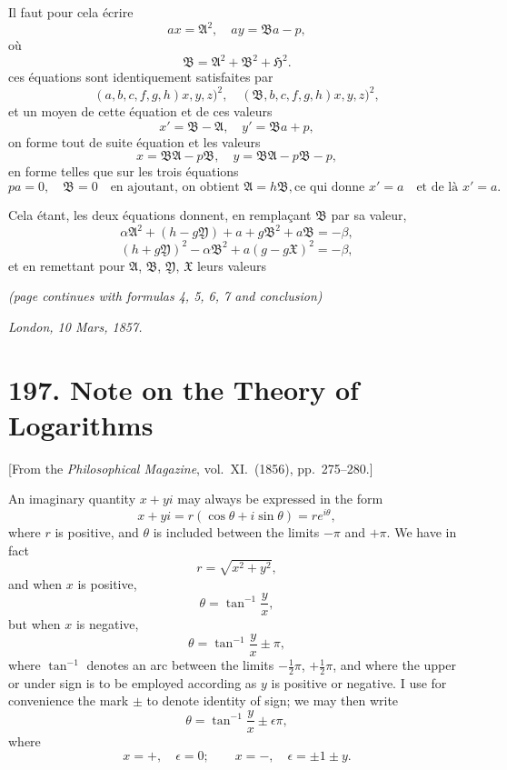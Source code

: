 \documentclass[11pt,a4paper]{book}
\begin{document}
\medskip

Il faut pour cela \'ecrire
\[
ax = \mathfrak{A}^2, \quad ay = \mathfrak{B} a - p,
\]
o\`u
\[
\mathfrak{B} = \mathfrak{A}^2 + \mathfrak{B}^2 + \mathfrak{H}^2.
\]
ces \'equations sont identiquement satisfaites par
\[
(a, b, c, f, g, h)x, y, z)^2, \quad (\mathfrak{B}, b, c, f, g, h)x, y, z)^2,
\]
et un moyen de cette \'equation et de ces valeurs
\[
x' = \mathfrak{B} - \mathfrak{A}, \quad y' = \mathfrak{B} a + p,
\]
on forme tout de suite \'equation et les valeurs
\[
x = \mathfrak{B} \mathfrak{A} - p \mathfrak{B}, \quad y = \mathfrak{B} \mathfrak{A} - p \mathfrak{B} - p,
\]
en forme telles que sur les trois \'equations
\[
pa = 0, \quad \mathfrak{B} = 0 \quad \text{en ajoutant, on obtient } \mathfrak{A} = h\mathfrak{B}, \text{ce qui donne } x' = a \quad \text{et de l\`a } x' = a.
\]

Cela \'etant, les deux \'equations donnent, en rempla\c{c}ant $\mathfrak{B}$ par sa valeur,
\[
\alpha\mathfrak{A}^2 + (h - g\mathfrak{Y}) + a + g\mathfrak{B}^2 + a\mathfrak{B} = -\beta,
\]
\[
(h + g\mathfrak{Y})^2 - \alpha\mathfrak{B}^2 + a(g - g\mathfrak{X})^2 = -\beta,
\]
et en remettant pour $\mathfrak{A}$, $\mathfrak{B}$, $\mathfrak{Y}$, $\mathfrak{X}$ leurs valeurs

\noindent\textit{(page continues with formulas 4, 5, 6, 7 and conclusion)}

\medskip

\noindent\textit{London, 10 Mars, 1857.}

\newpage


\section*{197. Note on the Theory of Logarithms}

\begin{center}
[From the \textit{Philosophical Magazine}, vol.~XI.~(1856), pp.~275--280.]
\end{center}

\bigskip

An imaginary quantity $x+yi$ may always be expressed in the form
\[
x + yi = r(\cos\theta + i\sin\theta) = r e^{i\theta},
\]
where $r$ is positive, and $\theta$ is included between the limits $-\pi$ and $+\pi$. We have
in fact
\[
r = \sqrt{x^2 + y^2},
\]
and when $x$ is positive,
\[
\theta = \tan^{-1}\frac{y}{x},
\]
but when $x$ is negative,
\[
\theta = \tan^{-1}\frac{y}{x} \pm \pi,
\]
where $\tan^{-1}$ denotes an arc between the limits $-\tfrac{1}{2}\pi$, $+\tfrac{1}{2}\pi$, and where the upper
or under sign is to be employed according as $y$ is positive or negative. I use for convenience
the mark $\pm$ to denote identity of sign; we may then write
\[
\theta = \tan^{-1}\frac{y}{x} \pm \epsilon\pi,
\]
where
\[
x = +, \quad \epsilon = 0;\qquad x = -,\quad \epsilon = \pm 1 \pm y.
\]
\end{document}
